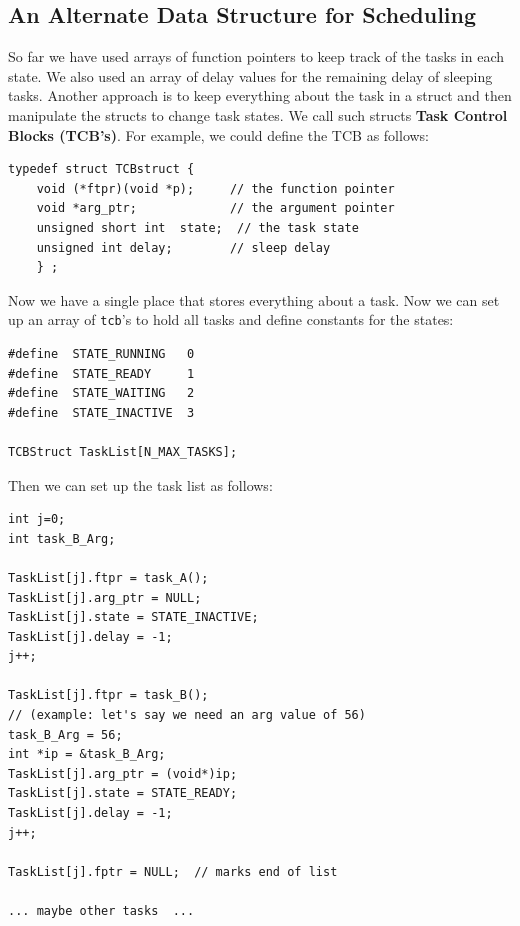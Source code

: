 
\subsection{An Alternate Data Structure for Scheduling}
So far we have used arrays of function pointers to keep track of the tasks in each state.  We also used an array of delay values for the remaining delay of sleeping tasks.   Another approach is to keep everything about the task in a struct and then manipulate the structs to change task states.  We call such structs {\bf Task Control Blocks (TCB's)}.   For example, we could define the TCB as follows:
\begin{verbatim}
typedef struct TCBstruct {
    void (*ftpr)(void *p);     // the function pointer
    void *arg_ptr;             // the argument pointer
    unsigned short int  state;  // the task state
    unsigned int delay;        // sleep delay
    } ;
\end{verbatim}

Now we have a single place that stores everything about a task.  Now we can set up an array of {\tt tcb}'s to hold all tasks and define constants for the states:


\begin{verbatim}
#define  STATE_RUNNING   0
#define  STATE_READY     1
#define  STATE_WAITING   2
#define  STATE_INACTIVE  3

TCBStruct TaskList[N_MAX_TASKS];
\end{verbatim}

Then we can set up the task list as follows:

\begin{verbatim} 
int j=0;
int task_B_Arg;

TaskList[j].ftpr = task_A();
TaskList[j].arg_ptr = NULL; 
TaskList[j].state = STATE_INACTIVE;
TaskList[j].delay = -1;
j++;

TaskList[j].ftpr = task_B();
// (example: let's say we need an arg value of 56)
task_B_Arg = 56;    
int *ip = &task_B_Arg;
TaskList[j].arg_ptr = (void*)ip; 
TaskList[j].state = STATE_READY;
TaskList[j].delay = -1;
j++;

TaskList[j].fptr = NULL;  // marks end of list

... maybe other tasks  ...
\end{verbatim}

